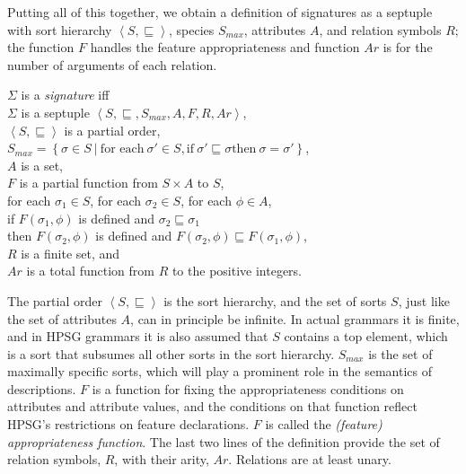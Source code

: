 \documentclass[output=paper,biblatex,babelshorthands,newtxmath,draftmode,colorlinks,citecolor=brown]{langscibook}
\begin{document}
{\largerpage[-1]
Putting all of this together, we obtain a definition of signatures
as a septuple with sort hierarchy $\left<S,\sqsubseteq\right>$, species
$S_{max}$, attributes $A$, and relation symbols $R$; the function $F$ handles
the feature appropriateness and function $Ar$ is for the number of arguments
of each relation.

\begin{mydef}\label{def-signature}
  $\Sigma$ is a \emph{signature} iff\\
  $\Sigma$ is a septuple $\left<S,\sqsubseteq,S_{max},A,F,R,Ar\right>$,\\
  $\left<S,\sqsubseteq\right>$ is a partial order,\\
  $S_{max} = \left\{\sigma\in S\ |\ \mbox{for each}\ \sigma' \in S, \mbox{if}\ \sigma'\sqsubseteq\sigma \mbox{then}\ \sigma=\sigma'\right\}$,\\
  $A$ is a set,\\
  $F$ is a partial function from $S\times A$ to $S$,\\
  for each $\sigma_1\in S$, for each $\sigma_2\in S$, for each $\phi\in A$,\\
  \hspace*{.5cm} if $F(\sigma_1,\phi)$ is defined and $\sigma_2\sqsubseteq\sigma_1$\\
  \hspace*{.5cm} then $F(\sigma_2,\phi)$ is defined and
             $F(\sigma_2,\phi)\sqsubseteq F(\sigma_1,\phi)$,\\
  $R$ is a finite set, and\\
  $Ar$ is a total function from $R$ to the positive integers.
\end{mydef}

The partial order $\left<S,\sqsubseteq\right>$ is the sort hierarchy,
and the set of sorts $S$, just like the set of attributes $A$, can in principle
be infinite. In actual grammars it is finite, and in HPSG grammars it is
also assumed that $S$ contains a top element, which is a sort that subsumes
all other sorts in the sort hierarchy. $S_{max}$ is the set of maximally
specific sorts, which will play a prominent role in the semantics of
descriptions. $F$ is a function for fixing the appropriateness conditions
on attributes and attribute values, and the conditions on that function
reflect HPSG's restrictions on feature declarations. $F$ is called the
\emph{(feature) appropriateness function}. The last two lines of
the definition provide the set of relation symbols, $R$, with their arity, $Ar$.
Relations are at least unary.

}
\end{document}

